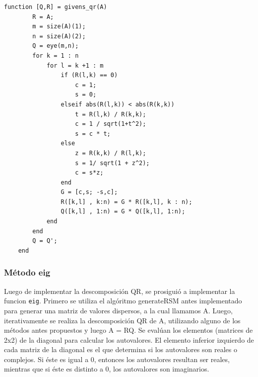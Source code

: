 \documentclass[a4paper,10pt,spanish]{article}
\begin{document}
\begin{lstlisting}[caption = Implementación de la descomposición QR con GS]
	function [Q,R] = givens_qr(A)
		R = A;
		m = size(A)(1);
		n = size(A)(2);
		Q = eye(m,n);
		for k = 1 : n
			for l = k +1 : m
				if (R(l,k) == 0)
					c = 1;
					s = 0;
				elseif abs(R(l,k)) < abs(R(k,k))
					t = R(l,k) / R(k,k);
					c = 1 / sqrt(1+t^2);
					s = c * t;
				else
					z = R(k,k) / R(l,k);
					s = 1/ sqrt(1 + z^2);
					c = s*z;
				end
				G = [c,s; -s,c];
				R([k,l] , k:n) = G * R([k,l], k : n);
				Q([k,l] , 1:n) = G * Q([k,l], 1:n);
			end
		end
		Q = Q';
	end
\end{lstlisting}




\subsubsection{Método eig}

Luego de implementar la descomposición QR, se prosiguió a implementar la funcion \texttt{eig}. Primero se utiliza el algóritmo generateRSM antes implementado para generar una matriz de valores dispersos, a la cual llamamos A. Luego, iterativamente se realiza la descomposición QR de A, utilizando alguno de los métodos antes propuestos y luego A = RQ. Se evalúan los elementos (matrices de 2x2) de la diagonal para calcular los autovalores. El elemento inferior izquierdo de cada matriz de la diagonal es el que determina si los autovalores son reales o complejos. Si éste es igual a 0, entonces los autovalores resultan ser reales, mientras que si éste es distinto a 0, los autovalores son imaginarios.
\end{document}
